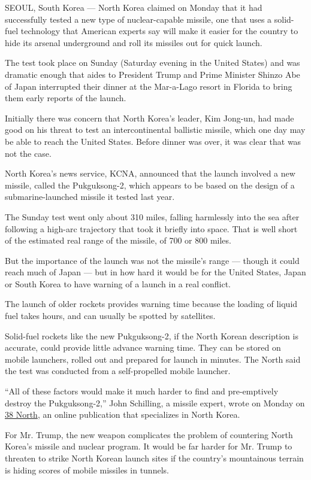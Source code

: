 SEOUL, South Korea --- North Korea claimed on Monday that it had
successfully tested a new type of nuclear-capable missile, one that uses
a solid-fuel technology that American experts say will make it easier
for the country to hide its arsenal underground and roll its missiles
out for quick launch.

The test took place on Sunday (Saturday evening in the United States)
and was dramatic enough that aides to President Trump and Prime Minister
Shinzo Abe of Japan interrupted their dinner at the Mar-a-Lago resort in
Florida to bring them early reports of the launch.

Initially there was concern that North Korea's leader, Kim Jong-un, had
made good on his threat to test an intercontinental ballistic missile,
which one day may be able to reach the United States. Before dinner was
over, it was clear that was not the case.

North Korea's news service, KCNA, announced that the launch involved a
new missile, called the Pukguksong-2, which appears to be based on the
design of a submarine-launched missile it tested last year.

The Sunday test went only about 310 miles, falling harmlessly into the
sea after following a high-arc trajectory that took it briefly into
space. That is well short of the estimated real range of the missile, of
700 or 800 miles.

But the importance of the launch was not the missile's range --- though
it could reach much of Japan --- but in how hard it would be for the
United States, Japan or South Korea to have warning of a launch in a
real conflict.

The launch of older rockets provides warning time because the loading of
liquid fuel takes hours, and can usually be spotted by satellites.

Solid-fuel rockets like the new Pukguksong-2, if the North Korean
description is accurate, could provide little advance warning time. They
can be stored on mobile launchers, rolled out and prepared for launch in
minutes. The North said the test was conducted from a self-propelled
mobile launcher.

``All of these factors would make it much harder to find and
pre-emptively destroy the Pukguksong-2,'' John Schilling, a missile
expert, wrote on Monday on \href{http://38north.org/}{38 North}, an
online publication that specializes in North Korea.

For Mr. Trump, the new weapon complicates the problem of countering
North Korea's missile and nuclear program. It would be far harder for
Mr. Trump to threaten to strike North Korean launch sites if the
country's mountainous terrain is hiding scores of mobile missiles in
tunnels.

